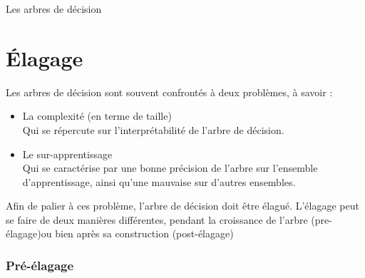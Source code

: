 \documentclass[a4paper, 11pt]{report}
\begin{document}
\begin{chapter}{Les arbres de décision}
\section{Élagage}
Les arbres de décision sont souvent confrontés à deux problèmes, à savoir :
\begin{itemize}
\item La complexité (en terme de taille)\\
Qui se répercute sur l'interprétabilité de l'arbre de décision.
\item Le sur-apprentissage \\
Qui se caractérise par une bonne précision de l'arbre sur l'ensemble d'apprentissage, ainsi qu'une mauvaise sur d'autres ensembles.
\end{itemize}
Afin de palier à ces problème, l'arbre de décision doit être élagué. L'élagage peut se faire de deux manières différentes, pendant la croissance de l'arbre (pre-élagage)ou bien après sa construction (post-élagage)
\\



\subsubsection{Pré-élagage}




\end{chapter}
\end{document}
